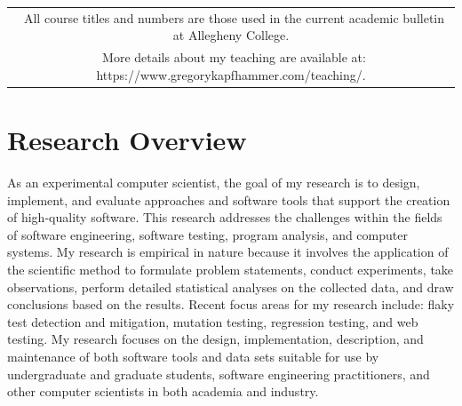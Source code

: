 \documentclass[11pt,letterpaper,sans]{moderncv}
\newcommand{\golink}{\faLink}
\newcommand{\goreminder}{\faBell}
\begin{document}

{\small
  \setlength\tabcolsep{6pt}
  \begin{tabular}{c}
  \goreminder{}~All course titles and numbers are those used in the current academic
    bulletin at Allegheny College. \\[0.1in]

  \golink{}~More details about my teaching are available at:
  https://www.gregorykapfhammer.com/teaching/.

\end{tabular} }

\vspace*{-.1in}
%
\section{Research Overview}


{\small
  As an experimental computer scientist, the goal of my research is to design,
  implement, and evaluate approaches and software tools that support the
  creation of high-quality software. This research addresses the challenges
  within the fields of software engineering, software testing, program analysis,
  and computer systems. My research is empirical in nature because it involves
  the application of the scientific method to formulate problem statements,
  conduct experiments, take observations, perform detailed statistical analyses
  on the collected data, and draw conclusions based on the results. Recent
  focus areas for my research include: flaky test detection and mitigation,
  mutation testing, regression testing, and web testing. My research
  focuses on the design, implementation, description, and maintenance of both
  software tools and data sets suitable for use by undergraduate and
  graduate students, software engineering practitioners, and other computer
  scientists in both academia and industry.
}

\vspace*{.1in}

\end{document}
